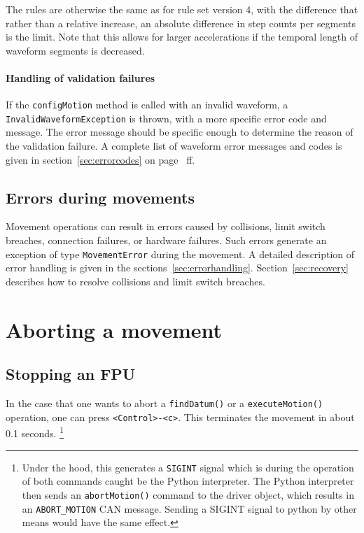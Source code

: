 \documentclass[fontsize=12,a4paper]{scrreprt}
\begin{document}
The rules are otherwise the same as for rule set version 4, with the
difference that rather than a relative increase, an absolute
difference in step counts per segments is the limit. Note that this
allows for larger accelerations if the temporal length of waveform
segments is decreased.




\paragraph{Handling of validation failures}

\begin{sloppypar}
If the \texttt{configMotion} method is called with an invalid
waveform, a \texttt{InvalidWaveformException} is thrown, with a more
specific error code and message. The error message should be specific
enough to determine the reason of the validation failure.  A complete
list of waveform error messages and codes is given in
section~\ref{sec:errorcodes} on page~\pageref{sec:errorcodes} ff.
\end{sloppypar}

\subsection{Errors during movements}
Movement operations can result in errors caused by collisions, limit
switch breaches, connection failures, or hardware failures. Such
errors generate an exception of type \texttt{MovementError} during the
movement. A detailed description of error handling is given in the
sections~\ref{sec:errorhandling}. Section~\ref{sec:recovery} describes
how to resolve collisions and limit switch breaches.





\section{Aborting a movement}
%
%
%
\subsection{Stopping an FPU}
In the case that one wants to abort a \texttt{findDatum()} or a
\texttt{executeMotion()} operation, one can press
\verb+<Control>-<c>+. This terminates the movement in about 0.1
seconds. \footnote{Under the hood, this generates a \texttt{SIGINT}
  signal which is during the operation of both commands caught be the
  Python interpreter. The Python interpreter then sends an
  \texttt{abortMotion()} command to the driver object, which results
  in an \texttt{ABORT\_MOTION} CAN message. Sending a SIGINT signal to
  python by other means would have the same effect.}
\end{document}
